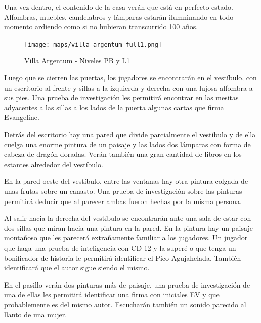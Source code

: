\documentclass[10pt,twoside,twocolumn,openany]{dndbook}
\begin{document}
Una vez dentro, el contenido de la casa verán que está en perfecto estado. Alfombras, muebles, 
candelabros y lámparas estarán ilumninando en todo momento ardiendo como si no hubieran 
transcurrido 100 años.

\begin{figure}
  \centering
  \texttt{[image: maps/villa-argentum-full1.png]}
  \caption{Villa Argentum - Niveles PB y L1}
  \label{fig:vaf}
\end{figure}



Luego que se cierren las puertas, los jugadores se encontrarán en el vestíbulo, con un escritorio 
al frente y sillas a la izquierda y derecha con una lujosa alfombra a sus pies. Una prueba de 
investigación les permitirá encontrar en las mesitas adyacentes a las sillas a los lados de la 
puerta algunas cartas que firma Evangeline.

Detrás del escritorio hay una pared que divide parcialmente el vestíbulo y de ella cuelga una 
enorme pintura de un paisaje y las lados dos lámparas con forma de cabeza de dragón doradas.
Verán también una gran cantidad de libros en los estantes alrededor del vestíbulo.

En la pared oeste del vestíbulo, entre las ventanas hay otra pintura colgada de unas frutas sobre 
un canasto. Una prueba de investigación sobre las pinturas permitirá deducir que al parecer ambas 
fueron hechas por la misma persona.


Al salir hacia la derecha del vestíbulo se encontrarán ante una sala de estar con dos sillas 
que miran hacia una pintura en la pared. En la pintura hay un paisaje montañoso que les parecerá
extrañamente familiar a los jugadores. Un jugador que haga una prueba de inteligencia con CD 12 
y la superé o que tenga un bonificador de historia le permitirá identificar el Pico Agujahelada.
También identificará que el autor sigue siendo el mismo.


En el pasillo verán dos pinturas más de paisaje, una prueba de investigación de una de ellas
les permitirá identificar una firma con iniciales EV y que probablemente es del mismo autor.
Escucharán también un sonido parecido al llanto de una mujer.


\end{document}
